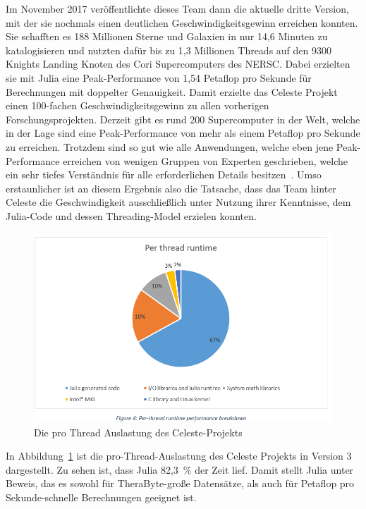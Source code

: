 \documentclass[proseminar,german,utf8]{zihpub}
\begin{document}
Im November 2017 veröffentlichte dieses Team dann die aktuelle dritte Version, mit der sie nochmals einen deutlichen Geschwindigkeitsgewinn erreichen konnten. Sie schafften es 188 Millionen Sterne und Galaxien in nur 14,6 Minuten zu katalogisieren und nutzten dafür bis zu 1,3 Millionen Threads auf den 9300 Knights Landing Knoten des Cori Supercomputers des NERSC. Dabei erzielten sie mit Julia eine Peak-Performance von 1,54 Petaflop pro Sekunde für Berechnungen mit doppelter Genauigkeit. Damit erzielte das Celeste Projekt einen 100-fachen Geschwindigkeitsgewinn zu allen vorherigen Forschungsprojekten. Derzeit gibt es rund 200 Supercomputer in der Welt, welche in der Lage sind eine Peak-Performance von mehr als einem Petaflop pro Sekunde zu erreichen. Trotzdem sind so gut wie alle Anwendungen, welche eben jene Peak-Performance erreichen von wenigen Gruppen von Experten geschrieben, welche ein sehr tiefes Verständnis für alle erforderlichen Details besitzen~\cite{CelesteNextPlatform}. Umso erstaunlicher ist an diesem Ergebnis also die Tatsache, dass das Team hinter Celeste die Geschwindigkeit ausschließlich unter Nutzung ihrer Kenntnisse, dem Julia-Code und dessen Threading-Model erzielen konnten.

\begin{figure}[hbt!]
  \centering
  \includegraphics[scale=0.65, trim={5mm 10mm 5mm 5mm},clip]{bilder/celestejulia.png}
  \caption{Die pro Thread Auslastung des Celeste-Projekts  \cite{CelesteNextPlatform}}
  \label{fig:celestejulia}
\end{figure}

In Abbildung~\ref{fig:celestejulia} ist die pro-Thread-Auslastung des Celeste Projekts in Version 3 dargestellt. Zu sehen ist, dass Julia 82,3~\% der Zeit lief. Damit stellt Julia unter Beweis, das es sowohl für TheraByte-große Datensätze, als auch für Petaflop pro Sekunde-schnelle Berechnungen geeignet ist. 
\end{document}
